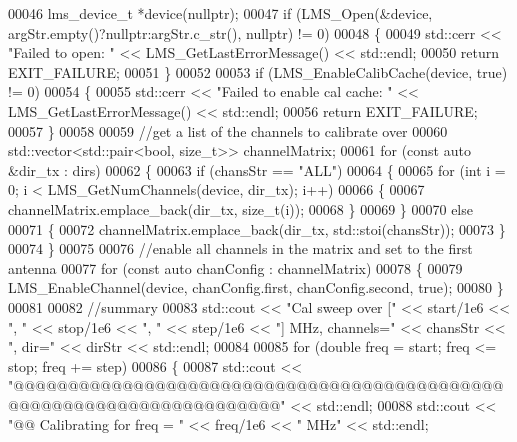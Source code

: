 \begin{DoxyCode}
00046     lms_device_t *device(\textcolor{keyword}{nullptr});
00047     \textcolor{keywordflow}{if} (LMS_Open(&device, argStr.empty()?\textcolor{keyword}{nullptr}:argStr.c\_str(), \textcolor{keyword}{nullptr}) != 0)
00048     \{
00049         std::cerr << \textcolor{stringliteral}{"Failed to open: "} << LMS_GetLastErrorMessage() << std::endl;
00050         \textcolor{keywordflow}{return} EXIT\_FAILURE;
00051     \}
00052 
00053     \textcolor{keywordflow}{if} (LMS_EnableCalibCache(device, \textcolor{keyword}{true}) != 0)
00054     \{
00055         std::cerr << \textcolor{stringliteral}{"Failed to enable cal cache: "} << LMS_GetLastErrorMessage() << std::endl;
00056         \textcolor{keywordflow}{return} EXIT\_FAILURE;
00057     \}
00058 
00059     \textcolor{comment}{//get a list of the channels to calibrate over}
00060     std::vector<std::pair<bool, size\_t>> channelMatrix;
00061     \textcolor{keywordflow}{for} (\textcolor{keyword}{const} \textcolor{keyword}{auto} &dir_tx : dirs)
00062     \{
00063         \textcolor{keywordflow}{if} (chansStr == \textcolor{stringliteral}{"ALL"})
00064         \{
00065             \textcolor{keywordflow}{for} (\textcolor{keywordtype}{int} i = 0; i < LMS_GetNumChannels(device, dir_tx); i++)
00066             \{
00067                 channelMatrix.emplace\_back(dir_tx, \textcolor{keywordtype}{size\_t}(i));
00068             \}
00069         \}
00070         \textcolor{keywordflow}{else}
00071         \{
00072             channelMatrix.emplace\_back(dir_tx, std::stoi(chansStr));
00073         \}
00074     \}
00075 
00076     \textcolor{comment}{//enable all channels in the matrix and set to the first antenna}
00077     \textcolor{keywordflow}{for} (\textcolor{keyword}{const} \textcolor{keyword}{auto} chanConfig : channelMatrix)
00078     \{
00079         LMS_EnableChannel(device, chanConfig.first, chanConfig.second, \textcolor{keyword}{true});
00080     \}
00081 
00082     \textcolor{comment}{//summary}
00083     std::cout << \textcolor{stringliteral}{"Cal sweep over ["} << start/1e6 << \textcolor{stringliteral}{", "} << stop/1e6 << \textcolor{stringliteral}{", "} << step/1e6 << \textcolor{stringliteral}{"] MHz,
       channels="} << chansStr << \textcolor{stringliteral}{", dir="} << dirStr << std::endl;
00084 
00085     \textcolor{keywordflow}{for} (\textcolor{keywordtype}{double} freq = start; freq <= stop; freq += step)
00086     \{
00087         std::cout << \textcolor{stringliteral}{"@@@@@@@@@@@@@@@@@@@@@@@@@@@@@@@@@@@@@@@@@@@@@@@@@@@@@@@@@@@@@@@@@@@@@@"} << std::endl;
00088         std::cout << \textcolor{stringliteral}{"@@  Calibrating for freq = "} << freq/1e6 << \textcolor{stringliteral}{" MHz"} << std::endl;

\end{DoxyCode}
